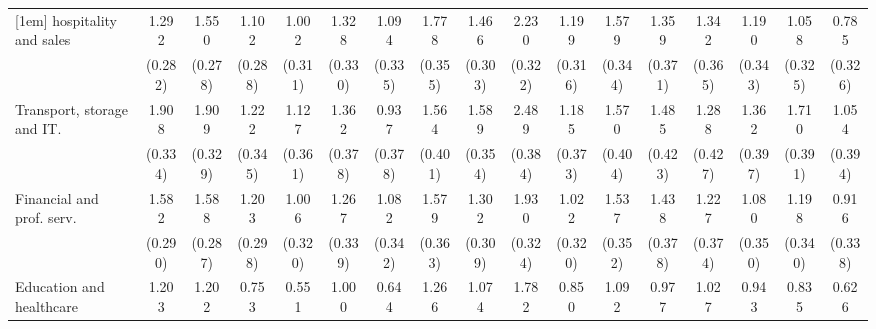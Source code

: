 {\begin{tabular}{l*{16}{c}}
[1em]
hospitality and sales&       1.292\sym{***}&       1.550\sym{***}&       1.102\sym{***}&       1.002\sym{**} &       1.328\sym{***}&       1.094\sym{**} &       1.778\sym{***}&       1.466\sym{***}&       2.230\sym{***}&       1.199\sym{***}&       1.579\sym{***}&       1.359\sym{***}&       1.342\sym{***}&       1.190\sym{***}&       1.058\sym{**} &       0.785\sym{*}  \\
                    &     (0.282)         &     (0.278)         &     (0.288)         &     (0.311)         &     (0.330)         &     (0.335)         &     (0.355)         &     (0.303)         &     (0.322)         &     (0.316)         &     (0.344)         &     (0.371)         &     (0.365)         &     (0.343)         &     (0.325)         &     (0.326)         \\
[1em]
Transport, storage and IT.&       1.908\sym{***}&       1.909\sym{***}&       1.222\sym{***}&       1.127\sym{**} &       1.362\sym{***}&       0.937\sym{*}  &       1.564\sym{***}&       1.589\sym{***}&       2.489\sym{***}&       1.185\sym{**} &       1.570\sym{***}&       1.485\sym{***}&       1.288\sym{**} &       1.362\sym{***}&       1.710\sym{***}&       1.054\sym{**} \\
                    &     (0.334)         &     (0.329)         &     (0.345)         &     (0.361)         &     (0.378)         &     (0.378)         &     (0.401)         &     (0.354)         &     (0.384)         &     (0.373)         &     (0.404)         &     (0.423)         &     (0.427)         &     (0.397)         &     (0.391)         &     (0.394)         \\
[1em]
Financial and prof. serv.&       1.582\sym{***}&       1.588\sym{***}&       1.203\sym{***}&       1.006\sym{**} &       1.267\sym{***}&       1.082\sym{**} &       1.579\sym{***}&       1.302\sym{***}&       1.930\sym{***}&       1.022\sym{**} &       1.537\sym{***}&       1.438\sym{***}&       1.227\sym{**} &       1.080\sym{**} &       1.198\sym{***}&       0.916\sym{**} \\
                    &     (0.290)         &     (0.287)         &     (0.298)         &     (0.320)         &     (0.339)         &     (0.342)         &     (0.363)         &     (0.309)         &     (0.324)         &     (0.320)         &     (0.352)         &     (0.378)         &     (0.374)         &     (0.350)         &     (0.340)         &     (0.338)         \\
[1em]
Education and healthcare&       1.203\sym{***}&       1.202\sym{***}&       0.753\sym{*}  &       0.551         &       1.000\sym{**} &       0.644         &       1.266\sym{***}&       1.074\sym{***}&       1.782\sym{***}&       0.850\sym{**} &       1.092\sym{**} &       0.977\sym{**} &       1.027\sym{**} &       0.943\sym{**} &       0.835\sym{*}  &       0.626         \\

\end{tabular}}
